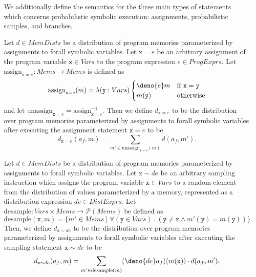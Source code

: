 \documentclass[acmsmall]{acmart}\settopmatter{}
\begin{document}
	We additionally define the semantics for the three main types of statements which concerns probabilistic symbolic execution: assignments, probabilistic samples, and branches.
	
	\begin{definition}
		Let $d \in MemDists$ be a distribution of program memories parameterized by assignments to forall symbolic variables. Let $\mathtt{x} = e$ be an arbitrary assignment of the program variable $\mathtt{x} \in Vars$ to the program expression $e \in ProgExprs$. Let $\text{assign}_{\mathtt{x}=e} : Mems \rightarrow Mems$ is defined as
		\[
		\text{assign}_{\mathtt{x}=e}(m) = \lambda(\mathtt{y} : Vars)
		\begin{cases}
			\deno{e}m & \text{if $\mathtt{x} = \mathtt{y}$}\\
			m(\mathtt{y}) & \text{otherwise}
		\end{cases}
		\]
		and let $\text{unassign}_{\mathtt{x}=e} = \text{assign}_{\mathtt{x}=e}^{-1}$. Then we define $d_{\mathtt{x}=e}$ to be the distribution over program memories parameterized by assignments to forall symbolic variables after executing the assignment statement $\mathtt{x}=e$ to be
		\[
		d_{\mathtt{x}=e}(a_f,m) = \sum_{m' \in \text{unassign}_{\mathtt{x}=e}(m)} d(a_f,m').
		\]
	\end{definition}
	
	\begin{definition}
		Let $d \in MemDists$ be a distribution of program memories parameterized by assignments to forall symbolic variables. Let $\mathtt{x} \sim de$ be an arbitrary sampling instruction which assigns the program variable $\mathtt{x} \in Vars$ to a random element from the distribution of values parameterized by a memory, represented as a distribution expression $de \in DistExprs$. Let $\text{desample} : Vars \times Mems \rightarrow \mathcal{P}(Mems)$ be defined as
		\[
		\text{desample}(\mathtt{x},m) = \{ m'\in Mems \mid \forall (\mathtt{y} \in Vars)~.~(\mathtt{y} \neq \mathtt{x} \wedge m'(\mathtt{y}) = m(\mathtt{y}))\}.
		\]
		Then, we define $d_{\mathtt{x} \sim de}$ to be the distribution over program memories parameterized by assignments to forall symbolic variables after executing the sampling statement $\mathtt{x} \sim de$ to be
		\[
		d_{\mathtt{x} \sim de}(a_f,m) = \sum_{m' \in \text{desample}(m)} (\deno{de}a_f)(m(\mathtt{x})) \cdot d(a_f,m').
		\]
	\end{definition}
	
\end{document}

